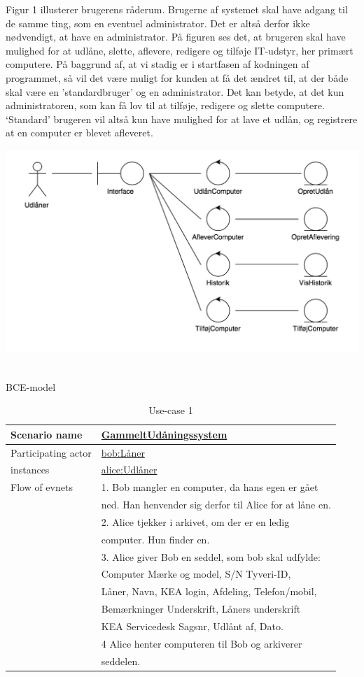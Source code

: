 \documentclass[a4paper]{article}
\begin{document}
Figur 1 illusterer brugerens råderum. Brugerne af systemet skal have adgang til de samme ting, som en eventuel administrator. Det er altså derfor ikke nødvendigt, at have en administrator. På figuren ses det, at brugeren skal have mulighed for at udlåne, slette, aflevere, redigere og tilføje IT-udstyr, her primært computere. På baggrund af, at vi stadig er i startfasen af kodningen af programmet, så vil det være muligt for kunden at få det ændret til, at der både skal være en 'standardbruger' og en administrator. Det kan betyde, at det kun administratoren, som kan få lov til at tilføje, redigere og slette  computere. ‘Standard' brugeren vil altså kun have mulighed for at lave et udlån, og registrere at en computer er blevet afleveret.\\
\centerline{\includegraphics[scale=0.5]{BCE.png}}\\
BCE-model
\newpage
\begin{table}[h]
\caption{Use-case 1}
\begin{tabular}{ll}
Scenario name                 & \underline{GammeltUdåningssystem} \\ \hline
Participating actor           & \underline{bob:Låner} \\
instances                     & \underline{alice:Udlåner} \\ \hline
Flow of evnets                & 1. Bob mangler en computer, da hans egen er gået \\& ned. Han henvender sig derfor til Alice for at låne en.
\\& 2. Alice tjekker i arkivet, om der er en ledig \\& computer. Hun finder en.
\\& 3. Alice giver Bob en seddel, som bob skal udfylde: \\& Computer Mærke og model, S/N Tyveri-ID, \\& Låner, Navn, KEA login, Afdeling, Telefon/mobil, \\& Bemærkninger Underskrift, Låners underskrift \\& KEA Servicedesk Sagsnr, Udlånt af, Dato.
\\& 4 Alice henter computeren til Bob og arkiverer
\\& seddelen.
\end{tabular}
\end{table}
\end{document}
